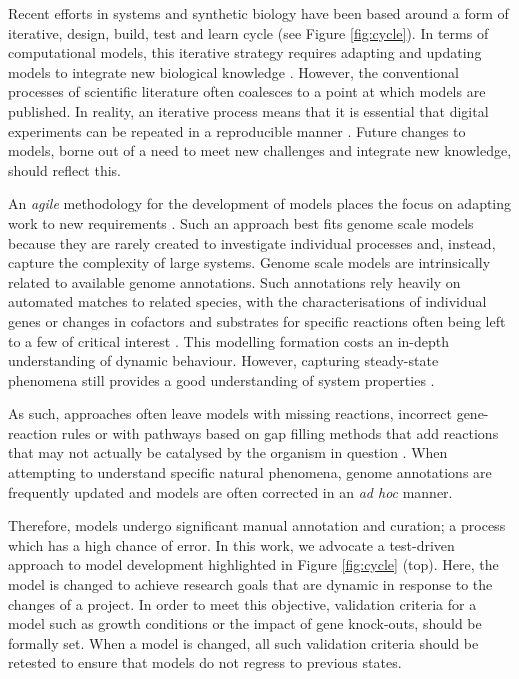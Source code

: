 \documentclass[journal=asbcd6]{achemso}
\begin{document}
Recent efforts in systems and synthetic biology have been based around a form of iterative, design, build, test and learn cycle \cite{carbonell2016bioinformatics} (see Figure \ref{fig:cycle}).
In terms of computational models, this iterative strategy requires adapting and updating models to integrate new biological knowledge \cite{reed2006towards}.
However, the conventional processes of scientific literature often coalesces to a point at which models are published.
In reality, an iterative process means that it is essential that digital experiments can be repeated in a reproducible manner \cite{cooper2015call}.
Future changes to models, borne out of a need to meet new challenges and integrate new knowledge, should reflect this.

An \textit{agile} methodology for the development of models places the focus on adapting work to new requirements \cite{martin2002agile}.
Such an approach best fits genome scale models because they are rarely created to investigate individual processes and, instead, capture the complexity of large systems.
Genome scale models are intrinsically related to available genome annotations.
Such annotations rely heavily on automated matches to related species, with the characterisations of individual genes or changes in cofactors and substrates for specific reactions often being left to a few of critical interest \cite{seemann2014prokka}.
This modelling formation costs an in-depth understanding of dynamic behaviour. 
However, capturing steady-state phenomena still provides a good understanding of system properties \cite{o2015using}.

As such, approaches often leave models with missing reactions, incorrect gene-reaction rules \cite{thiele2010protocol} or with pathways based on gap filling methods that add reactions that may not actually be catalysed by the organism in question \cite{benedict2014likelihood}.
When attempting to understand specific natural phenomena, genome annotations are frequently updated and models are often corrected in an \textit{ad hoc} manner.


Therefore, models undergo significant manual annotation and curation; a process which has a high chance of error.
In this work, we advocate a test-driven approach to model development highlighted in Figure \ref{fig:cycle} (top).
Here, the model is changed to achieve research goals that are dynamic in response to the changes of a project.
In order to meet this objective, validation criteria for a model such as growth conditions or the impact of gene knock-outs, should be formally set.
When a model is changed, all such validation criteria should be retested to ensure that models do not regress to previous states.
\end{document}
